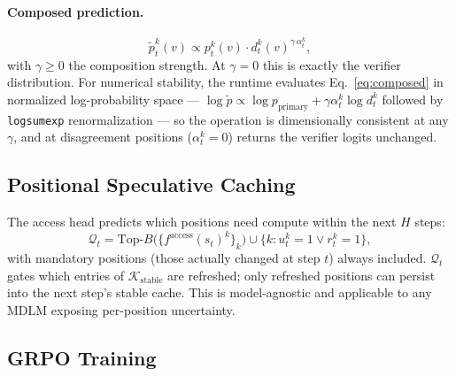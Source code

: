 \documentclass[11pt]{article}
\newcommand{\cK}{\mathcal{K}}
\newcommand{\cQ}{\mathcal{Q}}
\begin{document}
\paragraph{Composed prediction.}
\begin{equation}
    \tilde{p}_t^k(v) \propto p_t^k(v) \cdot d_t^k(v)^{\gamma\, \alpha_t^k},
    \label{eq:composed}
\end{equation}
with $\gamma \geq 0$ the composition strength.
At $\gamma{=}0$ this is exactly the verifier distribution.
For numerical stability, the runtime evaluates Eq.~\eqref{eq:composed} in normalized log-probability space — $\log \tilde p \propto \log p_{\text{primary}} + \gamma \alpha_t^k \log d_t^k$ followed by \texttt{logsumexp} renormalization — so the operation is dimensionally consistent at any $\gamma$, and at disagreement positions ($\alpha_t^k{=}0$) returns the verifier logits unchanged.

\subsection{Positional Speculative Caching}

The access head predicts which positions need compute within the next $H$ steps:
\begin{equation}
    \cQ_t = \mathrm{Top}\text{-}B\bigl(\{f^{\text{access}}(s_t)^k\}_k\bigr) \cup \{k : u_t^k = 1 \lor r_t^k = 1\},
\end{equation}
with mandatory positions (those actually changed at step $t$) always included.
$\cQ_t$ gates which entries of $\cK_{\text{stable}}$ are refreshed; only refreshed positions can persist into the next step's stable cache.  This is model-agnostic and applicable to any MDLM exposing per-position uncertainty.

\subsection{GRPO Training}
\end{document}
